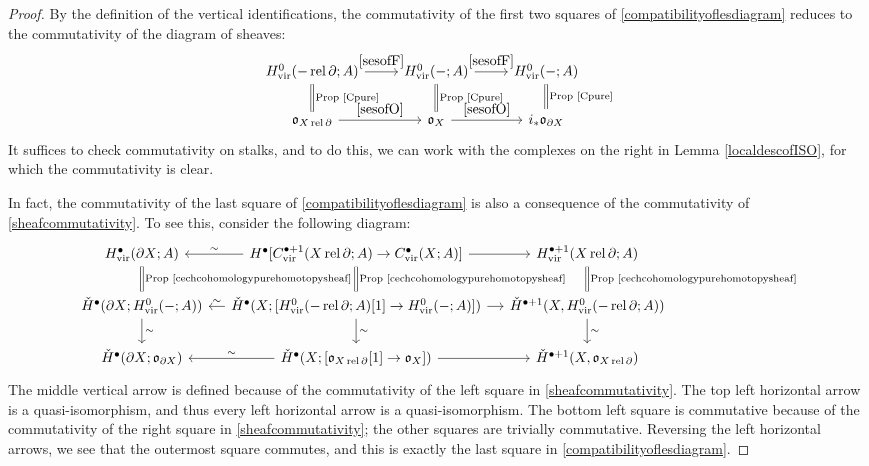 \documentclass[12pt]{article}
\theoremstyle{definition}
\theoremstyle{remark}
\numberwithin{equation}{subsection}
\newcommand{\oo}{\mathfrak o}
\newcommand{\cH}{\check H}
\newcommand{\vir}{\mathrm{vir}}
\newcommand{\rel}{\operatorname{rel}}
\begin{document}
\begin{proof}
By the definition of the vertical identifications, the commutativity of the first two squares of \eqref{compatibilityoflesdiagram} reduces to the commutativity of the diagram of sheaves:
\begin{equation}\label{sheafcommutativity}
\begin{tikzcd}
H^0_\vir(-\rel\partial;A)\ar{r}{\eqref{sesofF}}\ar[equal]{d}{\text{Prop \ref{Cpure}}}&H^0_\vir(-;A)\ar{r}{\eqref{sesofF}}\ar[equal]{d}{\text{Prop \ref{Cpure}}}&H^0_\vir(-;A)\ar[equal]{d}{\text{Prop \ref{Cpure}}}\\
\oo_{X\rel\partial}\ar{r}{\eqref{sesofO}}&\oo_X\ar{r}{\eqref{sesofO}}&i_\ast\oo_{\partial X}
\end{tikzcd}
\end{equation}
It suffices to check commutativity on stalks, and to do this, we can work with the complexes on the right in Lemma \ref{localdescofISO}, for which the commutativity is clear.

In fact, the commutativity of the last square of \eqref{compatibilityoflesdiagram} is also a consequence of the commutativity of \eqref{sheafcommutativity}.  To see this, consider the following diagram:
\begin{equation*}%
\begin{tikzcd}[column sep = small]
H^\bullet_\vir(\partial X;A)\ar[equal]{d}{\text{Prop \ref{cechcohomologypurehomotopysheaf}}}&\ar{l}[swap]{\sim}H^\bullet[C^{\bullet+1}_\vir(X\rel\partial;A)\to C^\bullet_\vir(X;A)]\ar{r}\ar[equal]{d}{\text{Prop \ref{cechcohomologypurehomotopysheaf}}}&H^{\bullet+1}_\vir(X\rel\partial;A)\ar[equal]{d}{\text{Prop \ref{cechcohomologypurehomotopysheaf}}}\\
\cH^\bullet(\partial X;H^0_\vir(-;A))\ar{d}{\sim}&\ar{l}[swap]{\sim}\cH^\bullet(X;[H^0_\vir(-\rel\partial;A)[1]\to H^0_\vir(-;A)])\ar{r}\ar{d}{\sim}&\cH^{\bullet+1}(X,H^0_\vir(-\rel\partial;A))\ar{d}{\sim}\\
\cH^\bullet(\partial X;\oo_{\partial X})&\ar{l}[swap]{\sim}\cH^\bullet(X;[\oo_{X\rel\partial}[1]\to\oo_X])\ar{r}&\cH^{\bullet+1}(X,\oo_{X\rel\partial})
\end{tikzcd}
\end{equation*}
The middle vertical arrow is defined because of the commutativity of the left square in \eqref{sheafcommutativity}.  The top left horizontal arrow is a quasi-isomorphism, and thus every left horizontal arrow is a quasi-isomorphism.  The bottom left square is commutative because of the commutativity of the right square in \eqref{sheafcommutativity}; the other squares are trivially commutative.  Reversing the left horizontal arrows, we see that the outermost square commutes, and this is exactly the last square in \eqref{compatibilityoflesdiagram}.
\end{proof}
\end{document}
